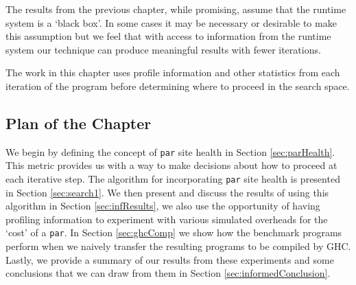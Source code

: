 The results from the previous chapter, while promising, assume that the runtime
system is a `black box'. In some cases it may be necessary or desirable to make
this assumption but we feel that with access to information from the runtime
system our technique can produce meaningful results with fewer iterations.

The work in this chapter uses profile information and other statistics from
each iteration of the program before determining where to proceed in the search
space.

\subsection*{Plan of the Chapter}

We begin by defining the concept of \verb|par| site health in Section
\ref{sec:parHealth}.  This metric provides us with a way to make decisions
about how to proceed at each iterative step. The algorithm for incorporating
\verb|par| site health is presented in Section \ref{sec:search1}. We then
present and discuss the results of using this algorithm in Section
\ref{sec:infResults}, we also use the opportunity of having profiling information to
experiment with various simulated overheads for the `cost' of a
\verb|par|. In Section \ref{sec:ghcComp} we show how the benchmark programs
perform when we naively transfer the resulting programs to be compiled by GHC.
Lastly, we provide a summary of our results from these experiments and some
conclusions that we can draw from them in Section \ref{sec:informedConclusion}.
